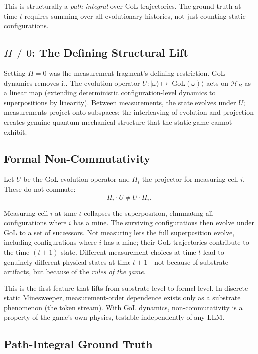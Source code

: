 \documentclass[12pt,a4paper]{article}
\theoremstyle{definition}
\theoremstyle{remark}
\newcommand{\Hil}{\mathcal{H}}
\newcommand{\ket}[1]{|#1\rangle}
\newcommand{\GoL}{\mathrm{GoL}}
\begin{document}
This is structurally a \emph{path integral} over GoL trajectories.  The ground truth at time $t$ requires summing over all evolutionary histories, not just counting static configurations.

\subsection{$H \neq 0$: The Defining Structural Lift}

Setting $H = 0$ was the measurement fragment's defining restriction.  GoL dynamics removes it.  The evolution operator $U: \ket{\omega} \mapsto \ket{\GoL(\omega)}$ acts on $\Hil_B$ as a linear map (extending deterministic configuration-level dynamics to superpositions by linearity).  Between measurements, the state evolves under $U$; measurements project onto subspaces; the interleaving of evolution and projection creates genuine quantum-mechanical structure that the static game cannot exhibit.

\subsection{Formal Non-Commutativity}
\label{sec:formal-noncommute}

Let $U$ be the GoL evolution operator and $\Pi_i$ the projector for measuring cell $i$.  These do not commute:
\begin{equation}\label{eq:formal-noncommute}
  \Pi_i \cdot U \neq U \cdot \Pi_i.
\end{equation}

Measuring cell $i$ at time $t$ collapses the superposition, eliminating all configurations where $i$ has a mine.  The surviving configurations then evolve under GoL to a set of successors.  Not measuring lets the full superposition evolve, including configurations where $i$ has a mine; their GoL trajectories contribute to the time-$(t+1)$ state.  Different measurement choices at time $t$ lead to genuinely different physical states at time $t+1$---not because of substrate artifacts, but because of the \emph{rules of the game}.

This is the first feature that lifts from substrate-level to formal-level.  In discrete static Minesweeper, measurement-order dependence exists only as a substrate phenomenon (the token stream).  With GoL dynamics, non-commutativity is a property of the game's own physics, testable independently of any LLM.

\subsection{Path-Integral Ground Truth}
\label{sec:path-integral}
\end{document}
